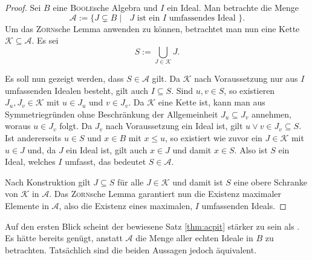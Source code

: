 \begin{proof}
  Sei $B$ eine \textsc{Boole}sche Algebra und $I$ ein Ideal. 
  Man betrachte die Menge
  \begin{displaymath}
    \mathcal{A} := \{J \subsetneq B \mid \text{ $J$ ist ein $I$ umfassendes Ideal } \}.
  \end{displaymath}
  Um das \textsc{Zorn}sche Lemma anwenden zu können, betrachtet man nun eine Kette $\mathcal{K} \subseteq \mathcal{A}$.
  Es sei 
  \begin{displaymath}
    S := \bigcup_{J \in \mathcal{K}} J.
  \end{displaymath}

  Es soll nun gezeigt werden, dass $S \in \mathcal{A}$ gilt.
  Da $\mathcal{K}$ nach Voraussetzung nur aus $I$ umfassenden Idealen besteht, gilt auch $I \subseteq S$.
  Sind $u,v \in S$, so existieren $J_u, J_v \in \mathcal{K}$ mit $u \in J_u$ und $v \in J_v$.
  Da $\mathcal{K}$ eine Kette ist, kann man aus Symmetriegründen ohne Beschränkung der Allgemeinheit $J_u \subseteq J_v$ annehmen, woraus $u \in J_v$ folgt.
  Da $J_v$ nach Voraussetzung ein Ideal ist, gilt $u \lor v \in J_v \subseteq S$.
  Ist andererseits $u \in S$ und $x \in B$ mit $x \leq u$, so existiert wie zuvor ein $J \in \mathcal{K}$ mit $u \in J$ und, da $J$ ein Ideal ist, gilt auch $x \in J$ und damit $x \in S$.
  Also ist $S$ ein Ideal, welches $I$ umfasst, das bedeutet $S \in \mathcal{A}$.

  Nach Konstruktion gilt $J \subseteq S$ für alle $J \in \mathcal{K}$ und damit ist $S$ eine obere Schranke von $\mathcal{K}$ in $\mathcal{A}$.
  Das \textsc{Zorn}sche Lemma garantiert nun die Existenz maximaler Elemente in $\mathcal{A}$, also die Existenz eines maximalen, $I$ umfassenden Ideals.
\end{proof}

\begin{bem}
  Auf den ersten Blick scheint der bewiesene Satz \ref{thm:acpit} stärker zu sein als \PIT.
  Es hätte bereits genügt, anstatt $\mathcal{A}$ die Menge aller echten Ideale in $B$ zu betrachten.
  Tatsächlich sind die beiden Aussagen jedoch äquivalent.
\end{bem}

